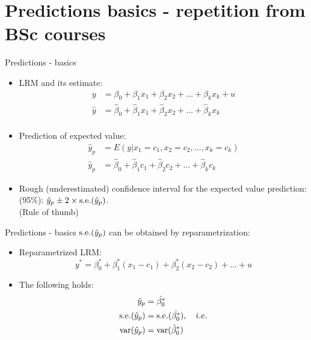 \documentclass{beamer}
\begin{document}

\section{Predictions basics - repetition from BSc courses}

\begin{frame}{Predictions - basics}
\begin{itemize}
\item LRM and its estimate:
\begin{align}\nonumber
y & = \beta_0 + \beta_1 x_1 +\beta_2 x_2 + \dots + \beta_k x_k + u\\ \nonumber
\hat{y} & = \hat{\beta}_0 + \hat{\beta}_1 x_1 +\hat{\beta}_2 x_2 + \dots + \hat{\beta}_k x_k \\ \nonumber
\end{align}
\item Prediction of expected value: 
\begin{align}\nonumber
\hat{y}_p & = E(y|x_1 = c_1, x_2 = c_2,\dots,x_k = c_k)\\ \nonumber
\hat{y}_p & = \hat{\beta}_0 + \hat{\beta}_1 c_1 +\hat{\beta}_2 c_2 + \dots + \hat{\beta}_k c_k  \nonumber
\end{align}
\item Rough (underestimated) confidence interval for the expected value prediction: (95\%): $\hat{y}_p \pm 2 \times \textnormal{s.e.}(\hat{y}_p)$. \\ (Rule of thumb) 
\end{itemize}
\end{frame}


\begin{frame}{Predictions - basics}
$\textnormal{s.e.}(\hat{y}_p)$ can be obtained by reparametrization:

\vspace{0.5cm}
\begin{itemize}
\item Reparametrized LRM:
$$y^*=\beta^*_0 + \beta^*_1 (x_1 -c_1) + \beta^*_2(x_2 - c_2) + \dots + u$$
\item The following holds:
\begin{align} \nonumber
 \hat{y}_p &= \hat{\beta_0^*} \\ \nonumber
 \textnormal{s.e.}(\hat{y}_p ) &= 
   \textnormal{s.e.}(\hat{\beta_0^*}), \quad i.e. \\ \nonumber
 \textnormal{var}(\hat{y}_p) &= \textnormal{var}(\hat{\beta}_0^*)
\end{align} 
\end{itemize}
\end{frame}
\end{document}
